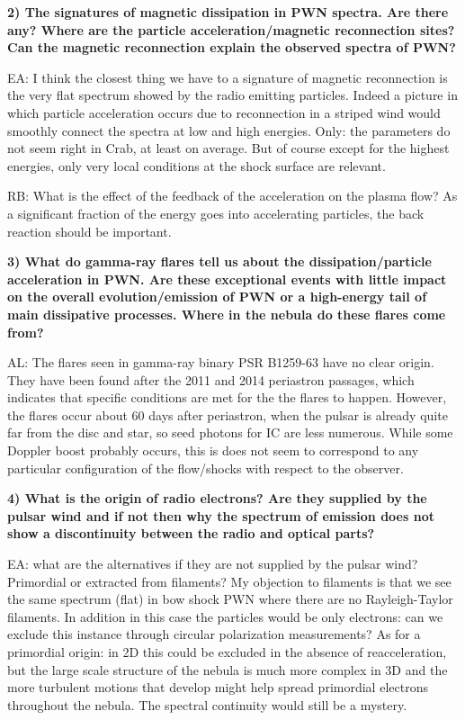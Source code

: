 \textbf{2) The signatures of magnetic dissipation in PWN spectra. Are there any?  Where are the particle acceleration/magnetic reconnection sites? Can the magnetic reconnection explain the observed spectra of PWN? }

EA: I think the closest thing we have to a signature of magnetic reconnection is the very flat spectrum showed by the radio emitting particles. Indeed a picture in which particle acceleration occurs due to reconnection in a striped wind would smoothly connect the spectra at low and high energies. Only: the parameters do not seem right in Crab, at least on average. But of course except for the highest energies, only very local conditions at the shock surface are relevant.

RB: What is the effect of the feedback of the acceleration on the plasma flow? As a significant fraction of the energy goes into accelerating particles, the back reaction should be important.

\textbf{3) What do gamma-ray flares tell us about the dissipation/particle acceleration in PWN. Are these exceptional events with little impact on the overall evolution/emission of PWN or a high-energy tail of main dissipative processes. Where in the nebula do these flares come from?  }

AL: The flares seen in gamma-ray binary PSR B1259-63 have no clear origin.  They have been found after the  2011 and 2014 periastron passages, which indicates that specific conditions are met for the the flares to happen. However, the flares occur about 60 days after periastron, when the pulsar is already quite far from the disc and star, so seed photons for IC are less numerous. While some Doppler boost probably occurs, this is does not seem to correspond to any particular configuration of the flow/shocks with respect to the observer.

\textbf{4) What is the origin of radio electrons? Are they supplied by the pulsar wind and if not then why the spectrum of emission does not show a discontinuity between the radio and optical parts? }

EA: what are the alternatives if they are not supplied by the pulsar wind? Primordial or extracted from filaments? My objection to filaments is that we see the same spectrum (flat) in bow shock PWN where there are no Rayleigh-Taylor filaments. In addition in this case the particles would be only electrons: can we exclude this instance through circular polarization measurements? As for a primordial origin: in 2D this could be excluded in the absence of reacceleration, but the large scale structure of the nebula is much more complex in 3D and the more turbulent motions that develop might help spread primordial electrons throughout the nebula. The spectral continuity would still be a mystery.

